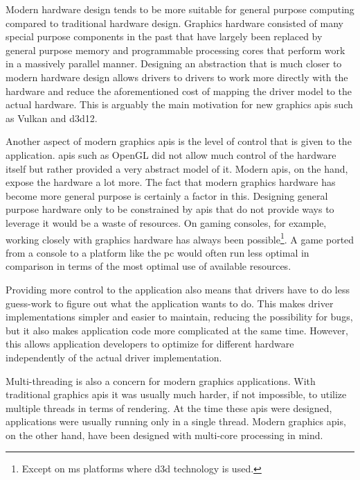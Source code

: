     Modern hardware design tends to be more suitable for general purpose computing compared to traditional hardware design.
    Graphics hardware consisted of many special purpose components in the past that have largely been replaced by general purpose memory and programmable processing cores that perform work in a massively parallel manner.
    Designing an abstraction that is much closer to modern hardware design allows drivers to drivers to work more directly with the hardware and reduce the aforementioned cost of mapping the driver model to the actual hardware.
    This is arguably the main motivation for new graphics \glspl{api} such as Vulkan and \gls{d3d12}.

    Another aspect of modern graphics \glspl{api} is the level of control that is given to the application.
    \glspl{api} such as OpenGL did not allow much control of the hardware itself but rather provided a very abstract model of it.
    Modern \glspl{api}, on the hand, expose the hardware a lot more.
    The fact that modern graphics hardware has become more general purpose is certainly a factor in this.
    Designing general purpose hardware only to be constrained by \glspl{api} that do not provide ways to leverage it would be a waste of resources.
    On gaming consoles, for example, working closely with graphics hardware has always been possible\footnote{Except on \gls{ms} platforms where \gls{d3d} technology is used.}.
    A game ported from a console to a platform like the \gls{pc} would often run less optimal in comparison in terms of the most optimal use of available resources.

    Providing more control to the application also means that drivers have to do less guess-work to figure out what the application wants to do.
    This makes driver implementations simpler and easier to maintain, reducing the possibility for \glspl{bug}, but it also makes application code more complicated at the same time.
    However, this allows application developers to optimize for different hardware independently of the actual driver implementation.

    Multi-threading is also a concern for modern graphics applications.
    With traditional graphics \glspl{api} it was usually much harder, if not impossible, to utilize multiple threads in terms of rendering.
    At the time these \glspl{api} were designed, applications were usually running only in a single thread.
    Modern graphics \glspl{api}, on the other hand, have been designed with multi-core processing in mind.

